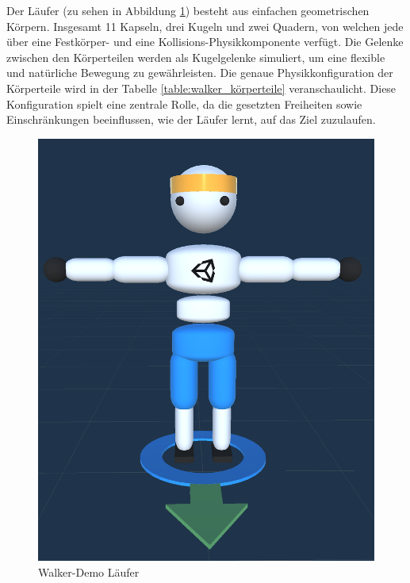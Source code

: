 Der Läufer (zu sehen in Abbildung \ref{fig:charakter_walker}) besteht aus einfachen geometrischen Körpern. Insgesamt 11 Kapseln, drei Kugeln und zwei Quadern, von welchen jede über eine Festkörper- und eine Kollisions-Physikkomponente verfügt. Die Gelenke zwischen den Körperteilen werden als Kugelgelenke simuliert, um eine flexible und natürliche Bewegung zu gewährleisten. Die genaue Physikkonfiguration der Körperteile wird in der Tabelle \ref{table:walker_körperteile} veranschaulicht. Diese Konfiguration spielt eine zentrale Rolle, da die gesetzten Freiheiten sowie Einschränkungen beeinflussen, wie der Läufer lernt, auf das Ziel zuzulaufen.

\begin{figure}[H]
  \centering  
  \includegraphics[scale=0.35]{img/charakter_walker}
  \caption{Walker-Demo Läufer}
  \label{fig:charakter_walker}
\end{figure}

